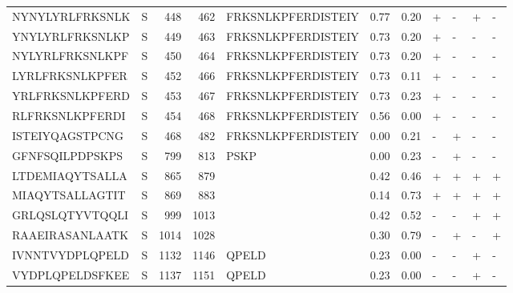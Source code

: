 \begin{tabular}{llrrlrrllll}
NYNYLYRLFRKSNLK &       S &    448 &   462 &  FRKSNLKPFERDISTEIY &            0.77 &             0.20 &      + &       - &      + &       - \\
YNYLYRLFRKSNLKP &       S &    449 &   463 &  FRKSNLKPFERDISTEIY &            0.73 &             0.20 &      + &       - &      - &       - \\
NYLYRLFRKSNLKPF &       S &    450 &   464 &  FRKSNLKPFERDISTEIY &            0.73 &             0.20 &      + &       - &      - &       - \\
LYRLFRKSNLKPFER &       S &    452 &   466 &  FRKSNLKPFERDISTEIY &            0.73 &             0.11 &      + &       - &      - &       - \\
YRLFRKSNLKPFERD &       S &    453 &   467 &  FRKSNLKPFERDISTEIY &            0.73 &             0.23 &      + &       - &      - &       - \\
RLFRKSNLKPFERDI &       S &    454 &   468 &  FRKSNLKPFERDISTEIY &            0.56 &             0.00 &      + &       - &      - &       - \\
ISTEIYQAGSTPCNG &       S &    468 &   482 &  FRKSNLKPFERDISTEIY &            0.00 &             0.21 &      - &       + &      - &       - \\
GFNFSQILPDPSKPS &       S &    799 &   813 &                PSKP &            0.00 &             0.23 &      - &       + &      - &       - \\
LTDEMIAQYTSALLA &       S &    865 &   879 &                     &            0.42 &             0.46 &      + &       + &      + &       + \\
MIAQYTSALLAGTIT &       S &    869 &   883 &                     &            0.14 &             0.73 &      + &       + &      + &       + \\
GRLQSLQTYVTQQLI &       S &    999 &  1013 &                     &            0.42 &             0.52 &      - &       - &      + &       + \\
RAAEIRASANLAATK &       S &   1014 &  1028 &                     &            0.30 &             0.79 &      - &       + &      - &       + \\
IVNNTVYDPLQPELD &       S &   1132 &  1146 &               QPELD &            0.23 &             0.00 &      - &       - &      + &       - \\
VYDPLQPELDSFKEE &       S &   1137 &  1151 &               QPELD &            0.23 &             0.00 &      - &       - &      + &       - \\
\bottomrule
\end{tabular}
